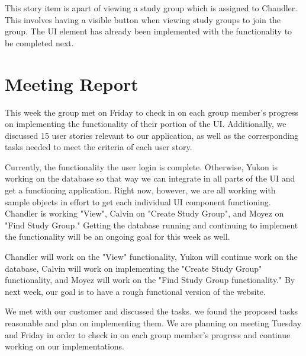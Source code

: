 \documentclass[12pt,letterpaper]{article}
\begin{document}
This story item is apart of viewing a study group which is assigned to Chandler. This involves having a visible button when viewing study groups to join the group. The UI element has already been implemented with the functionality to be completed next.

\clearpage
\section{Meeting Report}
This week the group met on Friday to check in on each group member's progress on implementing the functionality of their portion of the UI. Additionally, we discussed 15 user stories relevant to our application, as well as the corresponding tasks needed to meet the criteria of each user story.

Currently, the functionality the user login is complete. Otherwise, Yukon is working on the database so that way we can integrate in all parts of the UI and get a functioning application. Right now, however, we are all working with sample objects in effort to get each individual UI component functioning. Chandler is working "View", Calvin on "Create Study Group", and Moyez on "Find Study Group." Getting the database running and continuing to implement the functionality will be an ongoing goal for this week as well.

Chandler will work on the "View" functionality, Yukon will continue work on the database, Calvin will work on implementing the "Create Study Group" functionality, and Moyez will work on the "Find Study Group functionality." By next week, our goal is to have a rough functional version of the website.

We met with our customer and discussed the tasks. we found the proposed tasks reasonable and plan on implementing them. We are planning on meeting Tuesday and Friday in order to check in on each group member's progress and continue working on our implementations. 
\end{document}
